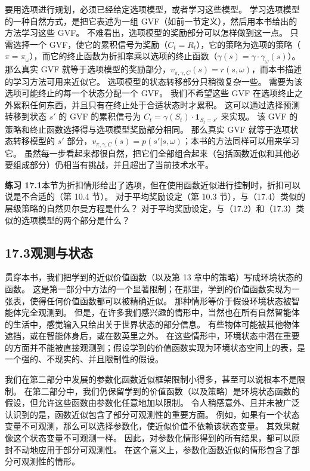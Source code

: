 \documentclass[UTF8, 12pt, fontset=fandol, oneside]{ctexart}
\begin{document}
要用选项进行规划，必须已经给定选项模型，或者学习这些模型。
学习选项模型的一种自然方式，是把它表述为一组 GVF（如前一节定义），然后用本书给出的方法学习这些 GVF。
不难看出，选项模型的奖励部分可以怎样做到这一点。
只需选择一个 GVF，使它的累积信号为奖励（$C_t=R_t$），它的策略为选项的策略（$\pi=\pi_\omega$），而它的终止函数为折扣率乘以选项的终止函数（$\gamma(s)=\gamma\cdot\gamma_\omega(s)$）。
那么真实 GVF 就等于选项模型的奖励部分，$v_{\pi,\gamma,C}(s)=r(s,\omega)$，而本书描述的学习方法可用来近似它。
选项模型的状态转移部分只稍微复杂一些。
需要为该选项可能终止的每一个状态分配一个 GVF。
我们不希望这些 GVF 在选项终止之外累积任何东西，并且只有在终止处于合适状态时才累积。
这可以通过选择预测转移到状态 $s'$ 的 GVF 的累积信号为 $C_t=\gamma(S_t)\cdot\mathbf{1}_{S_t=s'}$ 来实现。
该 GVF 的策略和终止函数选择得与选项模型奖励部分相同。
那么真实 GVF 就等于选项状态转移模型的 $s'$ 部分，$v_{\pi,\gamma,C}(s)=p(s'|s,\omega)$；本书的方法同样可以用来学习它。
虽然每一步看起来都很自然，把它们全部组合起来（包括函数近似和其他必要组成部分）仍相当有挑战，并且超出了当前技术水平。

\noindent\textbf{练习 17.1}\quad 本节为折扣情形给出了选项，但在使用函数近似进行控制时，折扣可以说是不合适的（第 10.4 节）。
对于平均奖励设定（第 10.3 节），与（17.4）类似的层级策略的自然贝尔曼方程是什么？
对于平均奖励设定，与（17.2）和（17.3）类似的选项模型的两个部分是什么？

\subsection*{17.3\quad 观测与状态}

贯穿本书，我们把学到的近似价值函数（以及第 13 章中的策略）写成环境状态的函数。
这是第一部分中方法的一个显著限制；在那里，学到的价值函数实现为一张表，使得任何价值函数都可以被精确近似。
那种情形等价于假设环境状态被智能体完全观测到。
但是，在许多我们感兴趣的情形中，当然也在所有自然智能体的生活中，感觉输入只给出关于世界状态的部分信息。
有些物体可能被其他物体遮挡，或在智能体身后，或在数英里之外。
在这些情形中，环境状态中潜在重要的方面并不能被直接观测到；假设学到的价值函数实现为环境状态空间上的表，是一个强的、不现实的、并且限制性的假设。

我们在第二部分中发展的参数化函数近似框架限制小得多，甚至可以说根本不是限制。
在第二部分中，我们仍保留学到的价值函数（以及策略）是环境状态函数的假设，但允许这些函数由参数化任意地加以限制。
令人稍感意外、且并未被广泛认识到的是，函数近似包含了部分可观测性的重要方面。
例如，如果有一个状态变量不可观测，那么可以选择参数化，使近似价值不依赖该状态变量。
其效果就像这个状态变量不可观测一样。
因此，对参数化情形得到的所有结果，都可以原封不动地应用于部分可观测性。
在这个意义上，参数化函数近似的情形包含了部分可观测性的情形。
\end{document}
